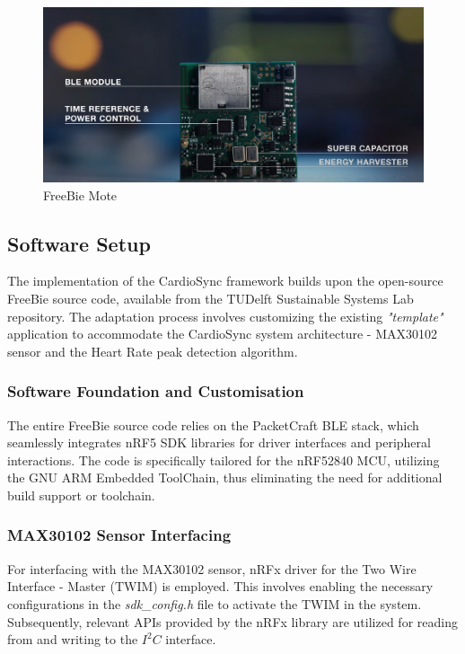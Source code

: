 \begin{figure}[H]
    \centering
    \includegraphics[width=\linewidth]{chapters/Implementation/Freebie.png}
    \caption{FreeBie Mote}
    \label{fig:freebie}
\end{figure}

\subsection{Software Setup}
\label{sec:software_setup_impl}

The implementation of the CardioSync framework builds upon the open-source FreeBie source code, available from the TUDelft Sustainable Systems Lab repository. The adaptation process involves customizing the existing \textit{"template"} application to accommodate the CardioSync system architecture  - MAX30102 sensor and the Heart Rate peak detection algorithm.

\subsubsection{Software Foundation and Customisation}

The entire FreeBie source code relies on the PacketCraft BLE stack, which seamlessly integrates nRF5 SDK libraries for driver interfaces and peripheral interactions. The code is specifically tailored for the nRF52840 MCU, utilizing the GNU ARM Embedded ToolChain, thus eliminating the need for additional build support or toolchain.

\subsubsection{MAX30102 Sensor Interfacing}

For interfacing with the MAX30102 sensor, nRFx driver for the Two Wire Interface - Master (TWIM) is employed. This involves enabling the necessary configurations in the \textit{sdk\_config.h} file to activate the TWIM in the system. Subsequently, relevant APIs provided by the nRFx library are utilized for reading from and writing to the \(I^2C\) interface.
 

